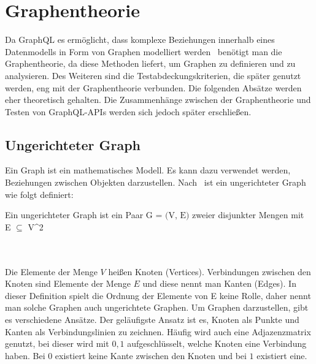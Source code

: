 \section{Graphentheorie}
\label{sec:graphentheorie}

Da GraphQL es ermöglicht, dass komplexe Beziehungen innerhalb eines Datenmodells in Form von Graphen modelliert werden~\cite[vgl. Modelling with Graph(QL)]{graphqlgraphtheory}
benötigt man die Graphentheorie, da diese Methoden liefert, um Graphen zu definieren und zu analysieren.
Des Weiteren sind die Testabdeckungskriterien, die später genutzt werden, eng mit der Graphentheorie verbunden.
Die folgenden Absätze werden eher theoretisch gehalten.
Die Zusammenhänge zwischen der Graphentheorie und Testen von GraphQL-APIs werden sich jedoch später erschließen.

\subsection{Ungerichteter Graph}

Ein Graph ist ein mathematisches Modell.
Es kann dazu verwendet werden, Beziehungen zwischen Objekten darzustellen.
Nach~\cite{graphentheorie} ist ein ungerichteter Graph wie folgt definiert:

\begin{definition}
    Ein ungerichteter Graph ist ein Paar $\textrm{G = (V, E)}$ zweier disjunkter Mengen mit \\ E $\subseteq$ V^2
    \label{graphdef}
\end{definition}\cite[vgl. S.2 0.1 Graphen]{graphentheorie}
\\
\\
Die Elemente der Menge $V$ heißen Knoten (Vertices).
Verbindungen zwischen den Knoten sind Elemente der Menge $E$ und diese nennt man Kanten (Edges).
In dieser Definition spielt die Ordnung der Elemente von E keine Rolle, daher nennt man solche Graphen auch ungerichtete Graphen.
Um Graphen darzustellen, gibt es verschiedene Ansätze.
Der geläufigste Ansatz ist es, Knoten als Punkte und Kanten als Verbindungslinien zu zeichnen.
Häufig wird auch eine Adjazenzmatrix genutzt, bei dieser wird mit $0,1$ aufgeschlüsselt, welche Knoten eine Verbindung haben.
Bei $0$ existiert keine Kante zwischen den Knoten und bei $1$ existiert eine.

